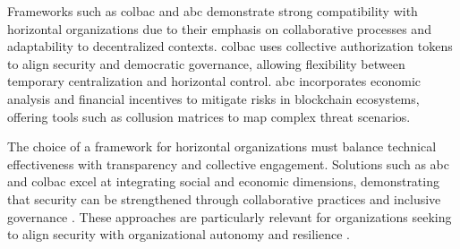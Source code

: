Frameworks such as \gls{colbac} and \gls{abc} demonstrate strong compatibility
with horizontal organizations due to their emphasis on collaborative processes
and adaptability to decentralized contexts. \gls{colbac} uses collective
authorization tokens to align security and democratic governance, allowing
flexibility between temporary centralization and horizontal control. \gls{abc}
incorporates economic analysis and financial incentives to mitigate risks in
blockchain ecosystems, offering tools such as collusion matrices to map complex
threat scenarios.

The choice of a framework for horizontal organizations must balance technical
effectiveness with transparency and collective engagement. Solutions such as
\gls{abc} and \gls{colbac} excel at integrating social and economic dimensions,
demonstrating that security can be strengthened through collaborative practices
and inclusive governance \cite{AbcCrypto, Colbac}. These approaches are
particularly relevant for organizations seeking to align security with
organizational autonomy and resilience \cite{Colbac}.

